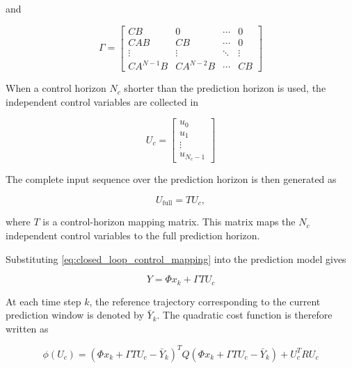 and

\begin{equation}
    \Gamma =
    \begin{bmatrix}
        CB & 0 & \cdots & 0 \\
        CAB & CB & \cdots & 0 \\
        \vdots & \vdots & \ddots & \vdots \\
        CA^{N-1}B & CA^{N-2}B & \cdots & CB
    \end{bmatrix}
\end{equation}

When a control horizon \(N_c\) shorter than the prediction horizon is used, the independent control variables are collected in

\begin{equation}
    U_c =
    \begin{bmatrix}
        u_0 \\
        u_1 \\
        \vdots \\
        u_{N_c-1}
    \end{bmatrix}
\end{equation}

The complete input sequence over the prediction horizon is then generated as

\begin{equation}
    U_{\mathrm{full}} = T U_c,
    \label{eq:closed_loop_control_mapping}
\end{equation}

where \(T\) is a control-horizon mapping matrix. This matrix maps the \(N_c\) independent control variables to the full prediction horizon.

Substituting \cref{eq:closed_loop_control_mapping} into the prediction model gives

\begin{equation}
    Y
    =
    \Phi x_k
    +
    \Gamma T U_c
    \label{eq:closed_loop_reduced_prediction}
\end{equation}

At each time step \(k\), the reference trajectory corresponding to the current prediction window is denoted by \(\bar{Y}_k\). The quadratic cost function is therefore written as

\begin{equation}
    \phi(U_c)
    =
    \left(
        \Phi x_k
        +
        \Gamma T U_c
        -
        \bar{Y}_k
    \right)^T
    Q
    \left(
        \Phi x_k
        +
        \Gamma T U_c
        -
        \bar{Y}_k
    \right)
    +
    U_c^T R U_c
    \label{eq:closed_loop_cost}
\end{equation}

